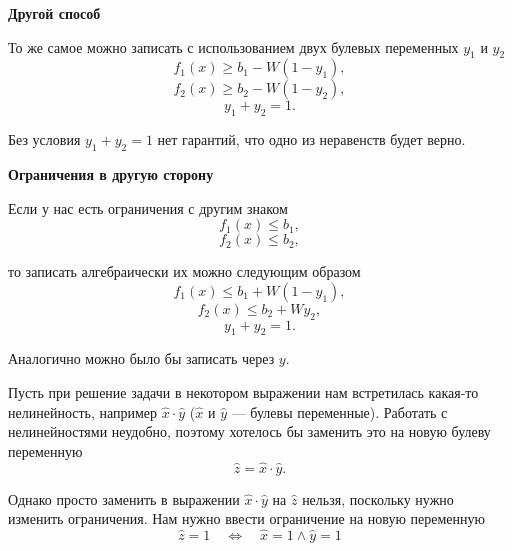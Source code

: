 \bigskip

\textbf{Другой способ}

То же самое можно записать с использованием двух булевых переменных $y_1$ и $y_2$
\[f_1(x) \ge b_1 - W(1-y_1),\]
\[f_2(x) \ge b_2 - W(1-y_2),\]
\[y_1+y_2 = 1.\]

Без условия $y_1 + y_2 = 1$ нет гарантий, что одно из неравенств будет верно.

\bigskip

\textbf{Ограничения в другую сторону}

Если у нас есть ограничения с другим знаком
\[f_1(x) \le b_1,\]
\[f_2(x) \le b_2,\]

то записать алгебраически их можно следующим образом
\[f_1(x) \le b_1 + W(1-y_1),\]
\[f_2(x) \le b_2 + Wy_2,\]
\[y_1 + y_2 = 1.\]

Аналогично можно было бы записать через $y$.

\label{fact:substituion_of_nonlinear}

Пусть при решение задачи в некотором выражении нам встретилась какая-то нелинейность, например $\hat{x} \cdot \hat{y}$ ($\hat{x}$ и $\hat{y}$ --- булевы переменные). Работать с нелинейностями неудобно, поэтому хотелось бы заменить это на новую булеву переменную
\[
\hat{z} = \hat{x} \cdot \hat{y}.
\]

Однако просто заменить в выражении $\hat{x} \cdot \hat{y}$ на $\hat{z}$ нельзя, поскольку нужно изменить ограничения. Нам нужно ввести ограничение на новую переменную
\[
\hat{z} = 1 \quad \Longleftrightarrow \quad \hat{x} = 1 \land \hat{y} = 1
\]

